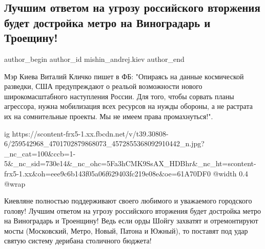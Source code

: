  
 
 
 
 
 
\subsection{Лучшим ответом на угрозу российского вторжения будет достройка метро на Виноградарь и Троещину!}
\label{sec:23_11_2021.fb.mishin_andrej.kiev.1.rossia_kiev_klichko}
 
\ifcmt
 author_begin
   author_id mishin_andrej.kiev
 author_end
\fi

Мэр Киева Виталий Кличко пишет в ФБ: "Опираясь на данные космической разведки,
США предупреждают  о реальой возможности нового широкомасштабного наступления
России. Для того, чтобы сорвать планы агрессора, нужна мобилизация всех
ресурсов на нужды обороны, а не растрата их на сомнительные проекты. Мы не
имеем права промахнуться!".

\ifcmt
  ig https://scontent-frx5-1.xx.fbcdn.net/v/t39.30808-6/259542968_4701702879868073_4572855368092910442_n.jpg?_nc_cat=100&ccb=1-5&_nc_sid=730e14&_nc_ohc=5Fa3hCMK9SsAX_HDBhr&_nc_ht=scontent-frx5-1.xx&oh=eee9c6b143f05a06f629403fc219e08e&oe=61A70DF0
  @width 0.4
  @wrap 
\fi

Киевляне полностью поддерживают своего  любимого и  уважаемого городского
голову! Лучшим ответом на угрозу российского вторжения будет достройка метро на
Виноградарь и Троенщину! Ведь если орды Шойгу захватят  и отремонтируют мосты
(Московский, Метро, Новый, Патона и Южный), то поставят под удар святую систему
дерибана столичного бюджета!

